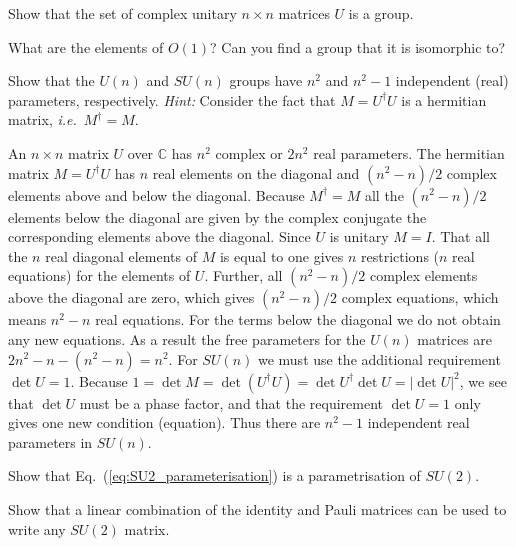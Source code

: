 \documentclass[notes.tex]{subfiles}
\begin{document}
\begin{Exercise}[]
Show that the set of complex unitary $n\times n$ matrices $U$ is a group.
\end{Exercise}

\begin{Exercise}[]
What are the elements of $O(1)$? Can you find a group that it is isomorphic to?
\end{Exercise}

\begin{Exercise}[label=ex:Un_parameters]
Show that the $U(n)$ and $SU(n)$ groups have $n^2$ and $n^2-1$ independent (real) parameters, respectively. {\it Hint:} Consider the fact that $M=U^\dagger U$ is a hermitian matrix, {\it i.e.}\ $M^\dagger=M$.
\end{Exercise}

\begin{Answer}
An $n\times n$ matrix $U$ over $\mathbb C$ has $n^2$ complex or $2n^2$ real parameters. The hermitian matrix $M=U^\dagger U$ has $n$ real elements on the diagonal
and $(n^2-n)/2$ complex elements above and below the diagonal. Because $M^\dagger=M$ all the $(n^2-n)/2$ elements below the diagonal are given by the complex conjugate the corresponding elements above the diagonal. Since $U$ is unitary $M=I$. That all the $n$ real diagonal elements of $M$ is equal to one gives $n$ restrictions ($n$ real equations) for the elements of $U$. Further, all $(n^2-n)/2$ complex elements above the diagonal are zero, which gives $(n^2-n)/2$ complex equations, which means $n^2-n$ real equations. For the terms below the diagonal we do not obtain any new equations. As a result the free parameters for the $U(n)$ matrices are $2n^2-n-(n^2-n)=n^2$.
For $SU(n)$ we must use the additional requirement $\det U=1$. Because $1=\det M=\det (U^\dagger U)=\det U^\dagger \det U=|\det U|^2$, we see that $\det U$ must be a phase factor, and that the requirement $\det U=1$ only gives one new condition (equation). Thus there are $n^2-1$ independent real parameters in $SU(n)$.
\end{Answer}

\begin{Exercise}[]
Show that Eq.~(\ref{eq:SU2_parameterisation}) is a parametrisation of $SU(2)$.
\end{Exercise}

\begin{Exercise}[]
Show that a linear combination of the identity and Pauli matrices can be used to write any $SU(2)$ matrix.
\end{Exercise}
\end{document}
